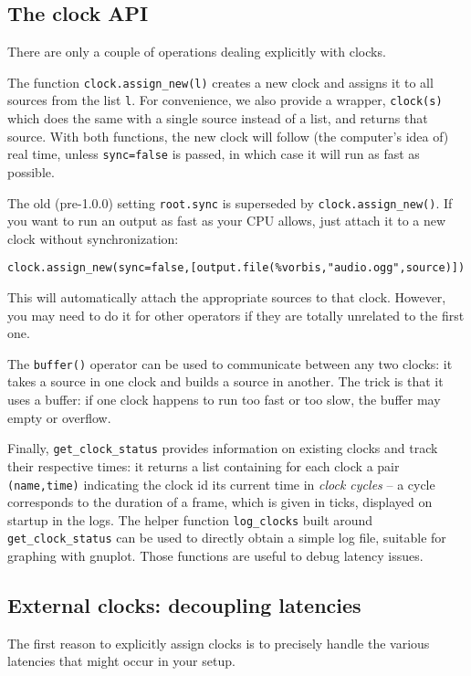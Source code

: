 \subsection{The clock API}
There are only a couple of operations dealing explicitly with clocks.

The function \verb+clock.assign_new(l)+ creates a new clock
and assigns it to all sources from the list \verb+l+.
For convenience, we also provide a wrapper, \verb+clock(s)+
which does the same with a single source instead of a list,
and returns that source.
With both functions, the new clock will follow (the computer's idea of)
real time, unless \verb+sync=false+ is passed, in which case
it will run as fast as possible.

The old (pre-1.0.0) setting \verb+root.sync+ is superseded
by \verb+clock.assign_new()+.
If you want to run an output as fast as your CPU allows,
just attach it to a new clock without synchronization:

\begin{verbatim}
clock.assign_new(sync=false,[output.file(%vorbis,"audio.ogg",source)])
\end{verbatim}
This will automatically attach the appropriate sources to that clock.
However, you may need to do it for other operators if they are totally
unrelated to the first one.

The \verb+buffer()+ operator can be used to communicate between
any two clocks: it takes a source in one clock and builds a source
in another. The trick is that it uses a buffer: if one clock
happens to run too fast or too slow, the buffer may empty or overflow.

Finally, \verb+get_clock_status+ provides information on
existing clocks and track their respective times:
it returns a list containing for each clock a pair
\verb+(name,time)+ indicating
the clock id its current time in \emph{clock cycles} --
a cycle corresponds to the duration of a frame,
which is given in ticks, displayed on startup in the logs.
The helper function \verb+log_clocks+ built
around \verb+get_clock_status+ can be used to directly
obtain a simple log file, suitable for graphing with gnuplot.
Those functions are useful to debug latency issues.

\subsection{External clocks: decoupling latencies}
The first reason to explicitly assign clocks is to precisely handle
the various latencies that might occur in your setup.

